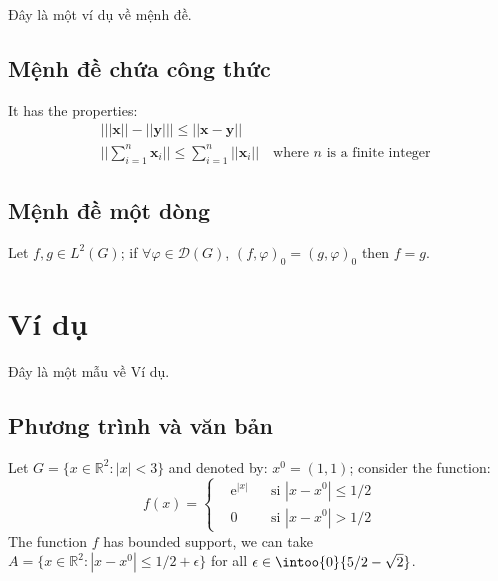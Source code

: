 \documentclass[11pt,fleqn]{book} %
\begin{document}
Đây là một ví dụ về mệnh đề.

\subsection{Mệnh đề chứa công thức}

\begin{proposition}
It has the properties:
\begin{align}
& \big| ||\mathbf{x}|| - ||\mathbf{y}|| \big|\leq || \mathbf{x}- \mathbf{y}||\\
&  ||\sum_{i=1}^n\mathbf{x}_i||\leq \sum_{i=1}^n||\mathbf{x}_i||\quad\text{where $n$ is a finite integer}
\end{align}
\end{proposition}

\subsection{Mệnh đề một dòng}

\begin{proposition} 
Let $f,g\in L^2(G)$; if $\forall \varphi\in\mathcal{D}(G)$, $(f,\varphi)_0=(g,\varphi)_0$ then $f = g$. 
\end{proposition}


\section{Ví dụ}

Đây là một mẫu về Ví dụ.

\subsection{Phương trình và văn bản}

\begin{example}
Let $G=\{x\in\mathbb{R}^2:|x|<3\}$ and denoted by: $x^0=(1,1)$; consider the function:
\begin{equation}
f(x)=\left\{\begin{aligned} & \mathrm{e}^{|x|} & & \text{si $|x-x^0|\leq 1/2$}\\
& 0 & & \text{si $|x-x^0|> 1/2$}\end{aligned}\right.
\end{equation}
The function $f$ has bounded support, we can take $A=\{x\in\mathbb{R}^2:|x-x^0|\leq 1/2+\epsilon\}$ for all $\epsilon\in\intoo{0}{5/2-\sqrt{2}}$.
\end{example}
\end{document}
